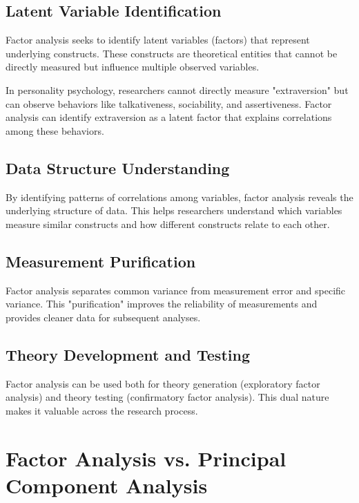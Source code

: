 \documentclass[a4paper]{tufte-book}
\begin{document}
\subsection{Latent Variable Identification}

Factor analysis seeks to identify latent variables (factors) that represent underlying constructs. These constructs are theoretical entities that cannot be directly measured but influence multiple observed variables.

\begin{practicalapplication}
In personality psychology, researchers cannot directly measure "extraversion" but can observe behaviors like talkativeness, sociability, and assertiveness. Factor analysis can identify extraversion as a latent factor that explains correlations among these behaviors.
\end{practicalapplication}

\subsection{Data Structure Understanding}

By identifying patterns of correlations among variables, factor analysis reveals the underlying structure of data. This helps researchers understand which variables measure similar constructs and how different constructs relate to each other.

\subsection{Measurement Purification}

Factor analysis separates common variance from measurement error and specific variance. This "purification" improves the reliability of measurements and provides cleaner data for subsequent analyses.

\subsection{Theory Development and Testing}

Factor analysis can be used both for theory generation (exploratory factor analysis) and theory testing (confirmatory factor analysis). This dual nature makes it valuable across the research process.

\section{Factor Analysis vs. Principal Component Analysis}
\end{document}
